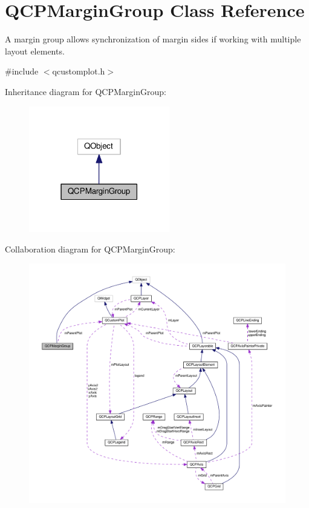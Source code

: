 \hypertarget{classQCPMarginGroup}{}\section{Q\+C\+P\+Margin\+Group Class Reference}
\label{classQCPMarginGroup}


A margin group allows synchronization of margin sides if working with multiple layout elements.  




{\ttfamily \#include $<$qcustomplot.\+h$>$}



Inheritance diagram for Q\+C\+P\+Margin\+Group\+:\nopagebreak
\begin{figure}[H]
\begin{center}
\leavevmode
\includegraphics[width=174pt]{classQCPMarginGroup__inherit__graph}
\end{center}
\end{figure}


Collaboration diagram for Q\+C\+P\+Margin\+Group\+:\nopagebreak
\begin{figure}[H]
\begin{center}
\leavevmode
\includegraphics[width=350pt]{classQCPMarginGroup__coll__graph}
\end{center}
\end{figure}

